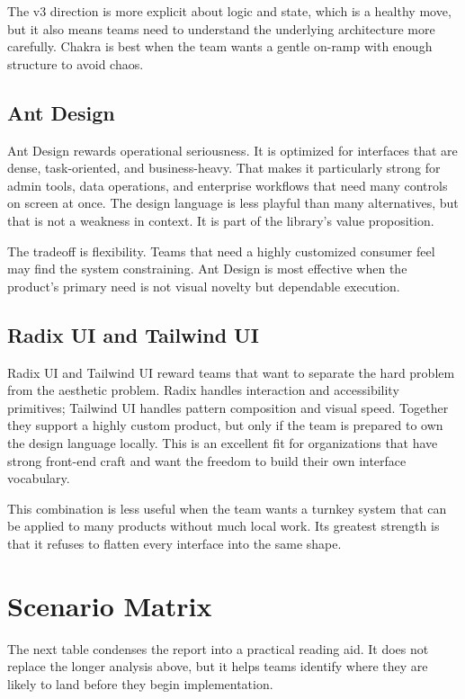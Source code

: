 \documentclass[11pt,twoside,a4paper]{article}
\begin{document}
The v3 direction is more explicit about logic and state, which is a healthy move, but it also means teams need to understand the underlying architecture more carefully. Chakra is best when the team wants a gentle on-ramp with enough structure to avoid chaos.

\subsection{Ant Design}
Ant Design rewards operational seriousness. It is optimized for interfaces that are dense, task-oriented, and business-heavy. That makes it particularly strong for admin tools, data operations, and enterprise workflows that need many controls on screen at once. The design language is less playful than many alternatives, but that is not a weakness in context. It is part of the library's value proposition.

The tradeoff is flexibility. Teams that need a highly customized consumer feel may find the system constraining. Ant Design is most effective when the product's primary need is not visual novelty but dependable execution.

\subsection{Radix UI and Tailwind UI}
Radix UI and Tailwind UI reward teams that want to separate the hard problem from the aesthetic problem. Radix handles interaction and accessibility primitives; Tailwind UI handles pattern composition and visual speed. Together they support a highly custom product, but only if the team is prepared to own the design language locally. This is an excellent fit for organizations that have strong front-end craft and want the freedom to build their own interface vocabulary.

This combination is less useful when the team wants a turnkey system that can be applied to many products without much local work. Its greatest strength is that it refuses to flatten every interface into the same shape.

\section{Scenario Matrix}
The next table condenses the report into a practical reading aid. It does not replace the longer analysis above, but it helps teams identify where they are likely to land before they begin implementation.
\end{document}
